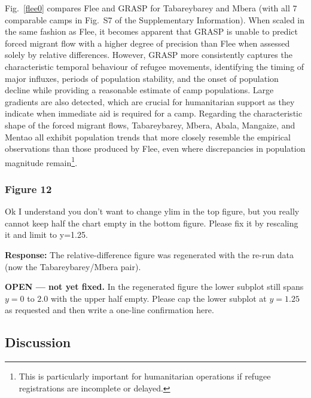 \documentclass[11pt,a4paper]{article}
\begin{document}
\vspace{0.3cm}
\begin{updatebox}
Fig.~\ref{flee0} compares Flee and GRASP for Tabareybarey and Mbera (with all 7 comparable camps in Fig.~S7 of the
Supplementary Information). When scaled in the same fashion as Flee, it becomes apparent that GRASP is unable to
predict forced migrant flow with a higher degree of precision than Flee when assessed solely by relative
differences. However, GRASP more consistently captures the characteristic temporal behaviour of refugee movements,
identifying the timing of major influxes, periods of population stability, and the onset of population decline while
providing a reasonable estimate of camp populations. Large gradients are also detected, which are crucial for
humanitarian support as they indicate when immediate aid is required for a camp. Regarding the characteristic shape
of the forced migrant flows, Tabareybarey, Mbera, Abala, Mangaize, and Mentao all exhibit population trends that more
closely resemble the empirical observations than those produced by Flee, even where discrepancies in population
magnitude remain\footnote{This is particularly important for humanitarian operations if refugee registrations are
incomplete or delayed.}.
\end{updatebox}

\subsubsection*{Figure 12}

\begin{reviewbox}
Ok I understand you don't want to change ylim in the top figure, but you really cannot keep half the chart empty in the bottom figure. Please fix it by rescaling it and limit to y=1.25.
\end{reviewbox}

\textbf{Response:} The relative-difference figure was regenerated with the re-run data (now the Tabareybarey/Mbera
pair).

\vspace{0.3cm}
\begin{flagbox}
\textbf{OPEN --- not yet fixed.} In the regenerated figure the lower subplot still spans $y=0$ to $2.0$ with the
upper half empty. Please cap the lower subplot at $y=1.25$ as requested and then write a one-line confirmation
here.
\end{flagbox}

\subsection*{Discussion}
\end{document}
